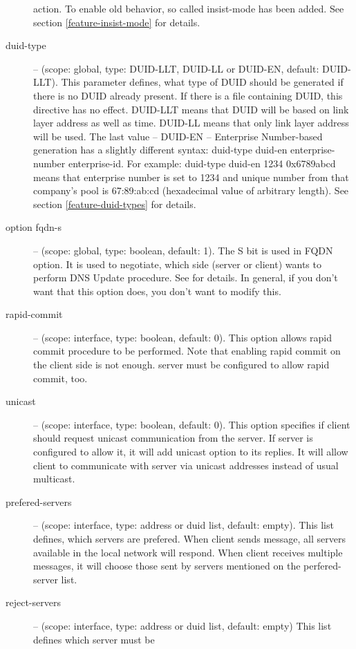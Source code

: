 \begin{description}
   action. To enable old behavior, so called insist-mode has been
   added. See section \ref{feature-insist-mode} for details.
 \item[duid-type] -- (scope: global, type: DUID-LLT, DUID-LL or
   DUID-EN, default: DUID-LLT). This parameter defines, what type of
   DUID should be generated if there is no DUID already present. If
   there is a file containing DUID, this directive has no
   effect. DUID-LLT means that DUID will be based on link layer
   address as well as time. DUID-LL means that only link layer address
   will be used. The last value -- DUID-EN -- Enterprise Number-based
   generation has a slightly different syntax: duid-type duid-en
   enterprise-number enterprise-id. For example: duid-type duid-en
   1234 0x6789abcd means that enterprise number is set to 1234 and
   unique number from that company's pool is 67:89:ab:cd (hexadecimal
   value of arbitrary length). See section \ref{feature-duid-types}
   for details.
\item[option fqdn-s] -- (scope: global, type: boolean, default:
  1). The S bit is used in FQDN option. It is used to negotiate, which
  side (server or client) wants to perform DNS Update procedure. See
  \cite{rfc4704} for details. In general, if you don't want that this
  option does, you don't want to modify this.
 \item[rapid-commit] -- (scope: interface, type: boolean, default:
   0). This option allows rapid commit procedure to be performed. Note
   that enabling rapid commit on the client side is not enough. server
   must be configured to allow rapid commit, too.
 \item[unicast] -- (scope: interface, type: boolean, default: 0). This
   option specifies if client should request unicast communication
   from the server. If server is configured to allow it, it will add
   unicast option to its replies. It will allow client to communicate
   with server via unicast addresses instead of usual multicast.
 \item[prefered-servers] -- (scope: interface, type: address or duid
   list, default: empty). This list defines, which servers are
   prefered. When client sends  message, all servers
   available in the local network will respond. When client receives
   multiple  messages, it will choose those sent by
   servers mentioned on the perfered-server list.
 \item[reject-servers] -- (scope: interface, type: address or duid
   list, default: empty) This list defines which server must be

\end{description}
